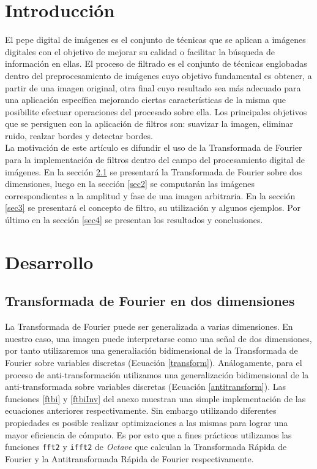 \documentclass{article}
\begin{document}
\begin{multicols}{2}

\section{Introducción}

\par 
El pepe digital de imágenes es el conjunto de técnicas que se aplican a imágenes digitales con el objetivo de mejorar su calidad o facilitar la búsqueda de información en ellas. El proceso de filtrado es el conjunto de técnicas englobadas dentro del preprocesamiento de imágenes cuyo objetivo fundamental es obtener, a partir de una imagen original, otra final cuyo resultado sea más adecuado para una aplicación específica mejorando ciertas características de la misma que posibilite efectuar operaciones del procesado sobre ella. Los principales objetivos que se persiguen con la aplicación de filtros son: suavizar la imagen, eliminar ruido, realzar bordes y detectar bordes.\\

La motivación de este artículo es difundir el uso de la Transformada de Fourier para la implementación de filtros dentro del campo del procesamiento digital de imágenes. En la sección \ref{sec1} se presentará la Transformada de Fourier sobre dos dimensiones, luego en la sección \ref{sec2} se computarán las imágenes correspondientes a la amplitud y fase de una imagen arbitraria. En la sección \ref{sec3} se presentará el concepto de filtro, su utilización y algunos ejemplos. Por último en la sección \ref{sec4} se presentan los resultados y conclusiones.

\section{Desarrollo}
\subsection{Transformada de Fourier en dos dimensiones}
\label{sec1}

\par La Transformada de Fourier puede ser generalizada a varias dimensiones. En nuestro caso, una imagen puede interpretarse como una señal de dos dimensiones, por tanto utilizaremos una generaliación bidimensional de la Transformada de Fourier sobre variables discretas (Ecuación \ref{transform}). Análogamente, para el proceso de anti-transformación utilizamos una generalización bidimensional de la anti-transformada sobre variables discretas (Ecuación \ref{antitransform}). Las funciones  \ref{ftbi} y \ref{ftbiInv} del anexo muestran una simple implementación de las ecuaciones anteriores respectivamente. Sin embargo utilizando diferentes propiedades es posible realizar optimizaciones a las mismas para lograr una mayor eficiencia de cómputo. Es por esto que a fines prácticos utilizamos las funciones \verb+fft2+ y \verb+ifft2+ de \textit{Octave} que calculan la Transformada Rápida de Fourier y la Antitransformada Rápida de Fourier respectivamente.


\end{multicols}
\end{document}
